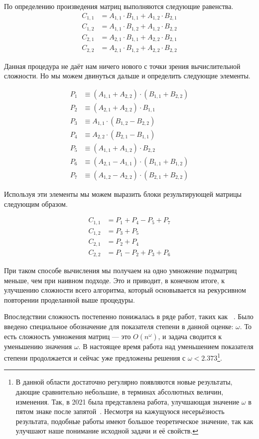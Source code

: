 По определению произведения матриц выполняются следующие равенства.
\begin {align*}
C_{1,1}&= A_{1,1} \cdot B_{1,1} + A_{1,2} \cdot B_{2,1} \\
C_{1,2}&= A_{1,1} \cdot B_{1,2} + A_{1,2} \cdot B_{2,2} \\
C_{2,1}&= A_{2,1} \cdot B_{1,1} + A_{2,2} \cdot B_{2,1} \\
C_{2,2}&= A_{2,1} \cdot B_{1,2} + A_{2,2} \cdot B_{2,2}
\end {align*}

Данная процедура не даёт нам ничего нового с точки зрения вычислительной сложности. Но мы можем двинуться дальше и определить следующие элементы.

\begin {align*}
P_1 & \equiv (A_{1,1} + A_{2,2}) \cdot (B_{1,1} + B_{2,2}) \\
P_2 & \equiv (A_{2,1} + A_{2,2}) \cdot B_{1,1} \\
P_3 & \equiv A_{1,1} \cdot (B_{1,2} - B_{2,2}) \\
P_4 & \equiv A_{2,2} \cdot (B_{2,1} - B_{1,1}) \\
P_5 & \equiv (A_{1,1} + A_{1,2}) \cdot B_{2,2}  \\
P_6 & \equiv (A_{2,1} - A_{1,1}) \cdot (B_{1,1} + B_{1,2}) \\
P_7 & \equiv (A_{1,2} - A_{2,2}) \cdot (B_{2,1} + B_{2,2})
\end {align*}

Используя эти элементы мы можем выразить блоки результирующей матрицы следующим образом.

\begin {align*}
C_{1,1} & = P_1 + P_4 - P_5 + P_7 \\
C_{1,2} & = P_3 + P_5 \\
C_{2,1} & = P_2 + P_4 \\
C_{2,2} & = P_1 - P_2 + P_3 + P_6
\end {align*}

При таком способе вычисления мы получаем на одно умножение подматриц меньше, чем при наивном подходе. Это и приводит, в конечном итоге, к улучшению сложности всего алгоритма, который основывается на рекурсивном повторении проделанной выше процедуры.

Впоследствии сложность постепенно понижалась в ряде работ, таких как ~\cite{Pan1978,BiniCapoRoma1979,Schonhage1981,CoppWino1982,CoppWino1990}. Было введено специальное обозначение для показателя степени в данной оценке: $\omega$. То есть сложность умножения матриц --- это $O(n^\omega)$, и задача сводится к уменьшению значения $\omega$. В настоящее время работа над уменьшением показателя степени продолжается и сейчас уже предложены решения с $\omega < 2.373$\footnote{В данной области достаточно регулярно появляются новые результаты, дающие сравнительно небольшие, в терминах абсолютных величин, изменения. Так, в 2021 была представлена работа, улучшающая значение $\omega$ в пятом знаке после запятой~\cite{alman2020refined}. Несмотря на кажущуюся несерьёзность результата, подобные работы имеют большое теоретическое значение, так как улучшают наше понимание исходной задачи и её свойств.}.

